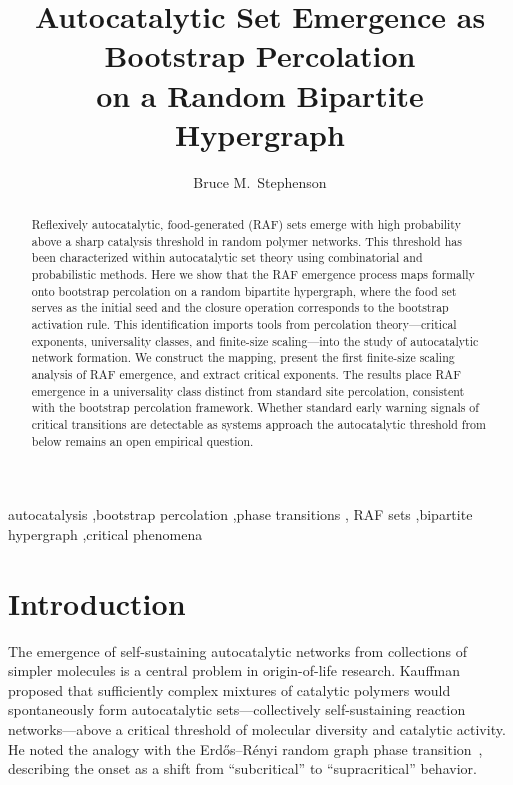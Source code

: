\documentclass[preprint,12pt]{elsarticle}
\begin{document}
\begin{frontmatter}

\title{Autocatalytic Set Emergence as Bootstrap Percolation\\on a Random Bipartite Hypergraph}

\author{Bruce M.~Stephenson}

\begin{abstract}
Reflexively autocatalytic, food-generated (RAF) sets emerge with high probability
above a sharp catalysis threshold in random polymer networks.
This threshold has been characterized within autocatalytic set theory
using combinatorial and probabilistic methods.
Here we show that the RAF emergence process maps formally onto
bootstrap percolation on a random bipartite hypergraph,
where the food set serves as the initial seed and the closure
operation corresponds to the bootstrap activation rule.
This identification imports tools from percolation theory---critical exponents,
universality classes, and finite-size scaling---into
the study of autocatalytic network formation.
We construct the mapping, present the first finite-size scaling analysis
of RAF emergence, and extract critical exponents.
The results place RAF emergence in a universality class distinct from
standard site percolation, consistent with the bootstrap percolation
framework.
Whether standard early warning signals of critical transitions
are detectable as systems approach the autocatalytic threshold
from below remains an open empirical question.
\end{abstract}

\begin{keyword}
autocatalysis \sep bootstrap percolation \sep phase transitions \sep
RAF sets \sep bipartite hypergraph \sep critical phenomena
\end{keyword}

\end{frontmatter}

\section{Introduction}
\label{sec:intro}

The emergence of self-sustaining autocatalytic networks from collections
of simpler molecules is a central problem in origin-of-life research.
Kauffman~\cite{kauffman1986autocatalytic,kauffman1993origins} proposed
that sufficiently complex mixtures of catalytic polymers would
spontaneously form autocatalytic sets---collectively self-sustaining
reaction networks---above a critical threshold of molecular diversity
and catalytic activity. He noted the analogy with the Erd\H{o}s--R\'enyi
random graph phase transition~\cite{erdos1959random}, describing
the onset as a shift from ``subcritical'' to ``supracritical'' behavior.
\end{document}
